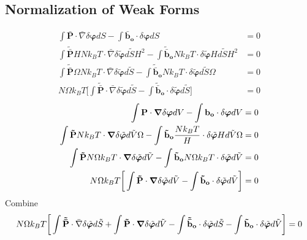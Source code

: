 \documentclass[12pt,3p]{article}
\numberwithin{equation}{section}
\begin{document}
\subsection{Normalization of Weak Forms}
\begin{align*}
\int \mathbf{\bar{P}} \cdot \bar{\nabla} \delta \boldsymbol\varphi dS - \int \mathbf{\bar{b}_o} \cdot \delta \boldsymbol\varphi dS &= 0 \\
\int \mathbf{\tilde{\bar{P}}}H N k_B T \cdot \bar{\nabla} \delta \tilde{\boldsymbol\varphi} d\tilde{S} H^2 - \int \mathbf{\tilde{\bar{b}}_o} N k_B T \cdot \delta \tilde{\boldsymbol\varphi} H d \tilde{S} H^2 &= 0 \\
\int \mathbf{\tilde{\bar{P}}} \Omega N k_B T \cdot \bar{\nabla} \delta \tilde{\boldsymbol\varphi} d\tilde{S} - \int \mathbf{\tilde{\bar{b}}_o} N k_B T \cdot \delta \tilde{\boldsymbol\varphi} d \tilde{S} \Omega &= 0 \\
N \Omega k_B T \bigg[ \int \mathbf{\tilde{\bar{P}}} \cdot \bar{\nabla} \delta \tilde{\boldsymbol\varphi} d\tilde{S} - \int \mathbf{\tilde{\bar{b}}_o} \cdot \delta \tilde{\boldsymbol\varphi} d \tilde{S} \bigg] &= 0 
\end{align*}
\begin{align*}
\int \mathbf{P} \cdot \grad \delta \boldsymbol\varphi dV - \int \mathbf{b_o} \cdot \delta \boldsymbol\varphi dV &= 0\\
\int \mathbf{\tilde{P}} N k_B T \cdot \grad \delta \tilde{\boldsymbol\varphi} d\tilde{V} \Omega - \int \mathbf{\tilde{b}_o} \frac{N k_B T}{H} \cdot \delta \tilde{\boldsymbol\varphi} H d\tilde{V} \Omega &= 0 \\
\int \mathbf{\tilde{P}} N \Omega k_B T \cdot \grad \delta \tilde{\boldsymbol\varphi} d\tilde{V} - \int \mathbf{\tilde{b}_o} N \Omega k_B T \cdot \delta \tilde{\boldsymbol\varphi} d\tilde{V} &= 0 \\
N \Omega k_B T \bigg[ \int \mathbf{\tilde{P}}  \cdot \grad \delta \tilde{\boldsymbol\varphi} d\tilde{V} - \int \mathbf{\tilde{b}_o} \cdot \delta \tilde{\boldsymbol\varphi} d\tilde{V} \bigg] &= 0 
\end{align*}
Combine
\begin{align*}
N \Omega k_B T \bigg[ \int \mathbf{\tilde{\bar{P}}} \cdot \bar{\nabla} \delta \tilde{\boldsymbol\varphi} d\tilde{S} + \int \mathbf{\tilde{P}}  \cdot \grad \delta \tilde{\boldsymbol\varphi} d\tilde{V} - \int \mathbf{\tilde{\bar{b}}_o} \cdot \delta \tilde{\boldsymbol\varphi} d \tilde{S} - \int \mathbf{\tilde{b}_o} \cdot \delta \tilde{\boldsymbol\varphi} d\tilde{V} \bigg] &= 0 \\
\end{align*}
\end{document}
